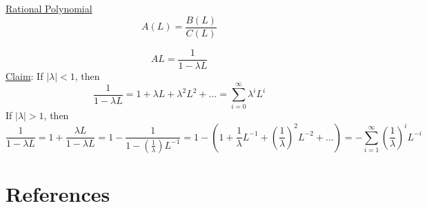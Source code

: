\documentclass[twoside]{article}
\begin{document}
\underline{Rational Polynomial}
\begin{equation}
    A(L) = \frac{B(L)}{C(L)}
\end{equation}
\begin{example}
    $$AL = \frac{1}{1- \lambda L}$$
    \underline{Claim}: If $|\lambda| <1 $, then \begin{equation}
        \frac{1}{1- \lambda L} = 1 + \lambda L + \lambda^2 L^2 + ... = \sum_{i=0}^{\infty} \lambda^{i} L^{i}
    \end{equation}
    If $|\lambda| >1 $, then \begin{equation}
        \frac{1}{1- \lambda L} = 1 + \frac{\lambda L}{1 - \lambda L} = 1 -  \frac{1}{1 - (\frac{1}{\lambda}) L^{-1}} = 1- (1 + \frac{1}{\lambda} L^{-1} + {\left (\frac{1}{\lambda} \right )}^2 L^{-2} + ...) = - \sum_{i=1}^{\infty} {\left (\frac{1}{\lambda} \right )}^{i} L^{-i}
    \end{equation}
\end{example}





\clearpage
\section*{References}

\end{document}
